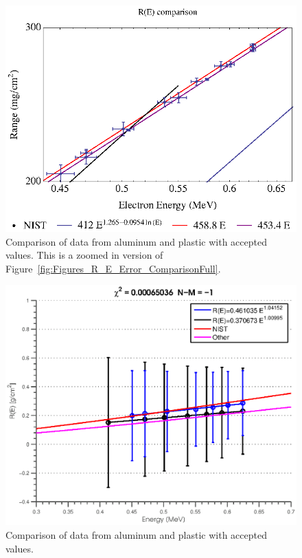 \begin{figure}[tbp]
	\centering
		\includegraphics[width=.8\textwidth]{Figures/R_E_Error_ComparisonFullZoomIn.eps}
	\caption{Comparison of data from aluminum and plastic with accepted values.  This is a zoomed in version of Figure~\ref{fig:Figures_R_E_Error_ComparisonFull}.}
	\label{fig:Figures_R_E_Error_ComparisonFullZoomIn}
\end{figure}%

\begin{figure}[htbp]
  \centering 
  \includegraphics[width=\MyWidth]{Figures/alum_plas_NIST_plot.eps}
  \caption{Comparison of data from aluminum and plastic with accepted values.}
  \label{fig:Figures_alum_plas_NIST_plot}
\end{figure}%


